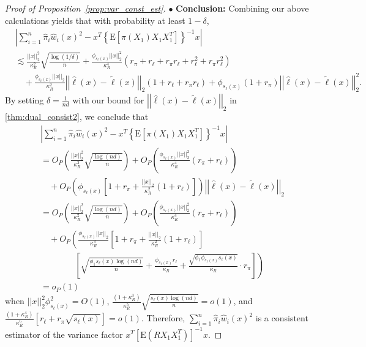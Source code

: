 \documentclass[ejsv2,noshowframe]{imsart}
\theoremstyle{plain}
\theoremstyle{definition}
\theoremstyle{remark}
\newcommand{\norm}[1]{\left|\left| #1 \right|\right|}
\renewcommand{\hat}{\widehat}
\renewcommand{\tilde}{\widetilde}
\begin{document}
\begin{proof}[Proof of Proposition~\ref{prop:var_const_est}]
	\noindent$\bullet$ \textbf{Conclusion:} Combining our above calculations yields that with probability at least $1-\delta$,
	\begin{align*}
		&\left|\sum_{i=1}^n \hat{\pi}_i \hat{w}_i(x)^2 - x^T\left\{\mathrm{E}\left[\pi(X_1) X_1X_1^T\right]\right\}^{-1}x \right| \\
		&\lesssim \frac{\norm{x}_2^2}{\kappa_R^2}\sqrt{\frac{\log(1/\delta)}{n}} + \frac{\phi_{s_{\ell}(x)} \norm{x}_2^2}{\kappa_R^4} \left(r_{\pi} + r_{\ell} + r_{\pi} r_{\ell} + r_{\ell}^2 + r_{\pi} r_{\ell}^2\right) \\
		&\quad + \frac{\phi_{s_{\ell}(x)} \norm{x}_2}{\kappa_R^2} \norm{\hat{\ell}(x) - \tilde{\ell}(x)}_2\left(1 + r_{\ell} + r_{\pi} r_{\ell}\right) + \phi_{s_{\ell}(x)}\left(1+r_{\pi}\right) \norm{\hat{\ell}(x) - \tilde{\ell}(x)}_2^2.
	\end{align*}
	By setting $\delta=\frac{1}{nd}$ with our bound for $\norm{\hat{\ell}(x) - \tilde{\ell}(x)}_2$ in \autoref{thm:dual_consist2}, we conclude that
	\begin{align*}
		&\left|\sum_{i=1}^n \hat{\pi}_i \hat{w}_i(x)^2 - x^T\left\{\mathrm{E}\left[\pi(X_1) X_1X_1^T\right]\right\}^{-1}x \right| \\
		&= O_P\left(\frac{\norm{x}_2^2}{\kappa_R^2}\sqrt{\frac{\log(nd)}{n}} \right) + O_P\left(\frac{\phi_{s_{\ell}(x)} \norm{x}_2^2}{\kappa_R^4} \left(r_{\pi} + r_{\ell}\right) \right) \\
		&\quad + O_P\left(\phi_{s_{\ell}(x)}\left[1+r_{\pi} + \frac{\norm{x}_2}{\kappa_R^2} (1+r_{\ell})\right]\right) \norm{\hat{\ell}(x) - \tilde{\ell}(x)}_2\\
		&= O_P\left(\frac{\norm{x}_2^2}{\kappa_R^2}\sqrt{\frac{\log(nd)}{n}} \right) + O_P\left(\frac{\phi_{s_{\ell}(x)} \norm{x}_2^2}{\kappa_R^4} \left(r_{\pi} + r_{\ell}\right) \right) \\
		&\quad + O_P\left(\frac{\phi_{s_{\ell}(x)}\norm{x}_2}{\kappa_R^3}\left[1+r_{\pi} + \frac{\norm{x}_2}{\kappa_R^2} (1+r_{\ell})\right] \right.\\
		&\quad \quad \quad \quad \left. \left[\sqrt{\frac{\phi_1 s_{\ell}(x) \log(nd)}{n}} + \frac{\phi_{s_{\ell}(x)} r_{\ell}}{\kappa_R} + \frac{\sqrt{\phi_1\phi_{s_{\ell}(x)} s_{\ell}(x)}}{\kappa_R} \cdot r_{\pi}\right]\right)\\
		&= o_P(1)
	\end{align*}
	when $\norm{x}_2^2 \phi_{s_{\ell}(x)}^2 = O(1)$, $\frac{(1+\kappa_R^3)}{\kappa_R^5} \sqrt{\frac{s_{\ell}(x)\log(nd)}{n}} = o(1)$, and $\frac{(1+\kappa_R^4)}{\kappa_R^6} \left[r_{\ell} + r_{\pi}\sqrt{s_{\ell}(x)}\right]=o(1)$.
	Therefore, $\sum_{i=1}^n \hat{\pi}_i \hat{w}_i(x)^2$ is a consistent estimator of the variance factor $x^T\left[\mathrm{E}\left(R X_1X_1^T\right)\right]^{-1}x$.
\end{proof}
\end{document}
